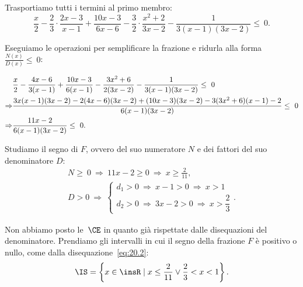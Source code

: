 \begin{exrig}
\begin{esempio}
Trasportiamo tutti i termini al primo membro:
\[\frac{x}{2}-\frac{2}{3}\cdot\frac{2x-3}{x-1}+\frac{10x-3}{6x-6}-\frac{3}{2}\cdot\frac{x^{2}+2}{3x-2}-\frac{1}{3(x-1)(3x-2)}\le~0.\]

Eseguiamo le operazioni per semplificare la frazione e ridurla alla
forma~$\frac{N(x)}{D(x)}\le~0$:

\begin{align}
  &\frac{x}{2}-\frac{4x-6}{3(x-1)}+\frac{10x-3}{6(x-1)}-\frac{3x^{2}+6}{2(3x-2)}-\frac{1}{3(x-1)(3x-2)}\le~0\notag\\
  \Rightarrow &\frac{3x(x-1)(3x-2)-2(4x-6)(3x-2)+(10x-3)(3x-2)-3(3x^{2}+6)(x-1)-2}{6(x-1)(3x-2)}\le~0\notag\\
  \Rightarrow &\frac{11x-2}{6(x-1)(3x-2)}\le~0. \label{eq:20.2}
\end{align}

Studiamo il segno di $F$, ovvero del suo numeratore $N$ e dei fattori del suo denominatore $D$:
 \[\begin{gathered}N\ge~0\:\Rightarrow\: 11x-2\ge 0\:\Rightarrow\: x\ge\frac{2}{11}\text{,}\\
		  D>0\:\Rightarrow\:\left\{\begin{array}{l}
			d_{1}>0\:\Rightarrow\: x-1>0\:\Rightarrow\: x>1\\
			d_{2}>0\:\Rightarrow\: 3x-2>0\:\Rightarrow\: x>\dfrac{2}{3}
			\end{array}\right.. \end{gathered}\]
\begin{center}

\end{center}
\pagebreak
Non abbiamo posto le~$\CE$ in quanto già rispettate dalle disequazioni
del denominatore. Prendiamo gli intervalli in cui il segno della frazione $F$ è positivo o
nullo, come dalla disequazione~\ref{eq:20.2}:
\[\IS=\left\{x\in \insR\mid x\le\frac{2}{11}\vee \frac{2}{3}<x<1\right\}.\]
 \end{esempio}
\end{exrig}
\ovalbox{\risolvii \ref{ese:20.57}, \ref{ese:20.58}, \ref{ese:20.59}, \ref{ese:20.60}, \ref{ese:20.61}, \ref{ese:20.62}, \ref{ese:20.63}, \ref{ese:20.64}, \ref{ese:20.65}, \ref{ese:20.66}}

\vspazio\ovalbox{\ref{ese:20.67}, \ref{ese:20.68}, \ref{ese:20.69}, \ref{ese:20.70}, \ref{ese:20.71}, \ref{ese:20.72}, \ref{ese:20.73}, \ref{ese:20.74}, \ref{ese:20.75}, \ref{ese:20.76}}
\newpage

\cleardoublepage

